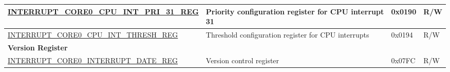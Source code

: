\begin{longtable}{ | p{10cm} | m{9cm} | m{1.3cm} | m{1.0cm} | }
\hyperref[regdesc:INTERRUPTCORE0CPUINTPRI0REG]{INTERRUPT\_CORE0\_CPU\_INT\_PRI\_31\_REG} & Priority configuration register for CPU interrupt 31 & 0x0190 & R/W \\ \hline
\hyperref[regdesc:INTERRUPTCORE0CPUINTTHRESHREG]{INTERRUPT\_CORE0\_CPU\_INT\_THRESH\_REG} & Threshold configuration register for CPU interrupts & 0x0194 & R/W \\ \hline
\multicolumn{4}{|l|}{\textbf{Version Register}} \\ \hline
\hyperref[regdesc:INTERRUPTCORE0INTERRUPTDATEREG]{INTERRUPT\_CORE0\_INTERRUPT\_DATE\_REG} & Version control register & 0x07FC & R/W \\ \hline
\end{longtable}
